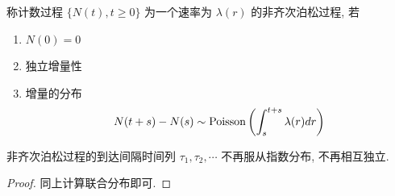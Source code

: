 \begin{definition}
    称计数过程 $\{N(t),t\geq 0\}$ 为一个速率为 $\lambda(r)$ 的非齐次泊松过程, 若
    \begin{enumerate}
        \item $N(0)=0$
        \item 独立增量性
        \item 增量的分布
        \[
        N(t+s)-N(s)\sim \operatorname{Poisson}\left(\int_s^{t+s}\lambda(r)dr\right)
        \]
    \end{enumerate}
\end{definition}

\begin{proposition}
    非齐次泊松过程的到达间隔时间列 $\tau_1,\tau_2,\cdots$ 不再服从指数分布, 不再相互独立.
\end{proposition}
\begin{proof}
    同上计算联合分布即可.
\end{proof}
\newpage